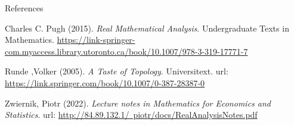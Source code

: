\documentclass [aspectratio=169]{beamer}
\begin{document}
\begin{frame}{References}
 
Charles C. Pugh (2015). \textit{Real Mathematical Analysis}. Undergraduate Texts in Mathematics. \href{https://link-springer-com.myaccess.library.utoronto.ca/book/10.1007/978-3-319-17771-7}{https://link-springer-com.myaccess.library.utoronto.ca/book/10.1007/978-3-319-17771-7}

\vspace{1em}

Runde ,Volker (2005). \textit{A Taste of Topology}. Universitext.  url:  \href{https://link.springer.com/book/10.1007/0-387-28387-0}{https://link.springer.com/book/10.1007/0-387-28387-0} 

\vspace{1em}

Zwiernik, Piotr (2022). \textit{Lecture notes in Mathematics for Economics and Statistics}. url: \href{http://84.89.132.1/~piotr/docs/RealAnalysisNotes.pdf}{http://84.89.132.1/~piotr/docs/RealAnalysisNotes.pdf} \\

\end{frame}
\end{document}
